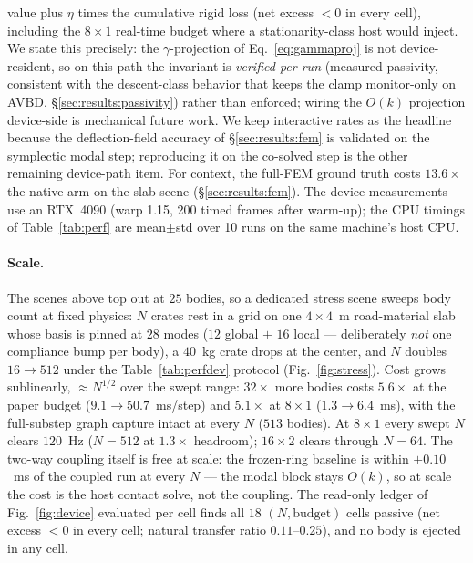 value plus $\eta$ times the cumulative rigid loss (net excess $<0$ in every
cell), including the $8{\times}1$ real-time budget where a stationarity-class
host would inject. We state this precisely: the $\gamma$-projection of
Eq.~\ref{eq:gammaproj} is not device-resident, so on this path the invariant
is \emph{verified per run} (measured passivity, consistent with the
descent-class behavior that keeps the clamp monitor-only on AVBD,
\S\ref{sec:results:passivity}) rather than enforced; wiring the $O(k)$
projection device-side is mechanical future work. We keep interactive rates
as the headline because the deflection-field accuracy of
\S\ref{sec:results:fem} is validated on the symplectic modal step;
reproducing it on the co-solved step is the other remaining device-path
item. For context, the full-FEM ground truth costs
$13.6\times$ the native arm on the slab scene (\S\ref{sec:results:fem}). The
device measurements use an RTX~4090 (warp 1.15, 200 timed frames after
warm-up); the CPU timings of Table~\ref{tab:perf} are mean$\pm$std over 10
runs on the same machine's host CPU.

\paragraph*{Scale.} The scenes above top out at $25$ bodies, so a dedicated
stress scene sweeps body count at fixed physics: $N$ crates rest in a grid on
one $4{\times}4$~m road-material slab whose basis is pinned at $28$ modes
($12$ global $+$ $16$ local --- deliberately \emph{not} one compliance bump
per body), a $40$~kg crate drops at the center, and $N$ doubles $16\to512$
under the Table~\ref{tab:perfdev} protocol (Fig.~\ref{fig:stress}). Cost
grows sublinearly, ${\approx}N^{1/2}$ over the swept range: $32\times$ more
bodies costs $5.6\times$ at the paper budget ($9.1\to50.7$~ms/step) and
$5.1\times$ at $8{\times}1$ ($1.3\to6.4$~ms), with the full-substep graph
capture intact at every $N$ ($513$ bodies). At $8{\times}1$ every swept $N$
clears $120$~Hz ($N{=}512$ at $1.3\times$ headroom); $16{\times}2$ clears
through $N{=}64$. The two-way coupling itself is free at scale: the
frozen-ring baseline is within $\pm0.10$~ms of the coupled run at every $N$
--- the modal block stays $O(k)$, so at scale the cost is the host contact
solve, not the coupling. The read-only ledger of Fig.~\ref{fig:device}
evaluated per cell finds all $18$ $(N,\text{budget})$ cells passive (net
excess $<0$ in every cell; natural transfer ratio $0.11$--$0.25$), and no
body is ejected in any cell.

